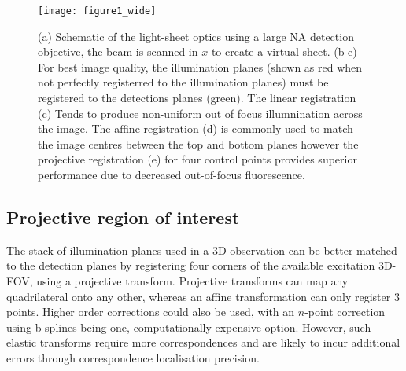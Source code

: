 \begin{figure}
  \texttt{[image: figure1\_wide]}
  \caption{
  (a) Schematic of the %
  light-sheet optics using a large NA detection objective, the beam is scanned in $x$ to create a virtual sheet.
  (b-e) For best image quality, the illumination planes (shown as red when not perfectly registerred to the illumination planes) must be registered to the detections planes (green). The linear registration (c) Tends to produce non-uniform out of focus illumnination across the image.
  The affine registration (d) is commonly used to match the image centres between the top and bottom planes however the projective registration (e) for four control points provides superior performance due to decreased out-of-focus fluorescence.
  }
  \label{fig:1}
\end{figure}


\subsection{Projective region of interest}

The stack of illumination planes used in a 3D observation can be better matched to the detection planes by registering four corners of the available excitation 3D-FOV, using a projective transform. %
Projective transforms can map any quadrilateral onto any other, whereas an affine transformation can only register 3 points. %
Higher order corrections could also be used, with an $n$-point correction using b-splines being one, computationally expensive option.
However, such elastic transforms require more correspondences and are likely to incur additional errors through correspondence localisation precision.%

